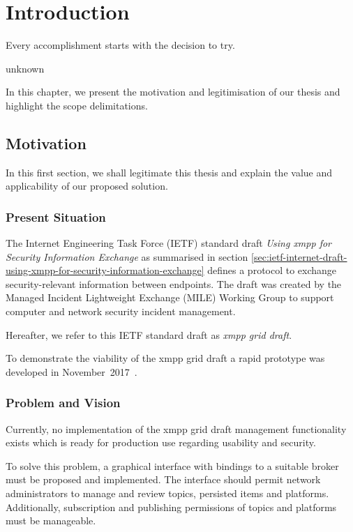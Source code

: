 \newcommand{\code}{\texttt}
\chapter{Introduction}
\label{sec:introduction}

\epigraph{Every accomplishment starts with the decision to try.}{unknown}
In this chapter, we present the motivation and legitimisation of our thesis and highlight the scope delimitations.

\section{Motivation}
In this first section, we shall legitimate this thesis and explain the value and applicability of our proposed solution.

\subsection{Present Situation}
The Internet Engineering Task Force (IETF) standard draft \emph{Using \gls{xmpp} for Security Information Exchange} \cite{ietf-mile-xmpp-grid-05} as summarised in section \ref{sec:ietf-internet-draft-using-xmpp-for-security-information-exchange} defines a protocol to exchange security-relevant information between endpoints.
The draft was created by the Managed Incident Lightweight Exchange (MILE) Working Group to support computer and network security incident management.

Hereafter, we refer to this IETF standard draft as \emph{\gls{xmpp} grid draft}.

To demonstrate the viability of the \gls{xmpp} grid draft a rapid prototype was developed in November~2017~\cite{xmpp-grid-prototype}.

\subsection{Problem and Vision}
Currently, no implementation of the \gls{xmpp} grid draft management functionality exists which is ready for production use regarding usability and security.

To solve this problem, a graphical interface with bindings to a suitable \gls{broker} must be proposed and implemented.
The interface should permit network administrators to manage and review \glspl{topic}, persisted items and \glspl{platform}.
Additionally, subscription and publishing permissions of \glspl{topic} and \glspl{platform} must be manageable.

